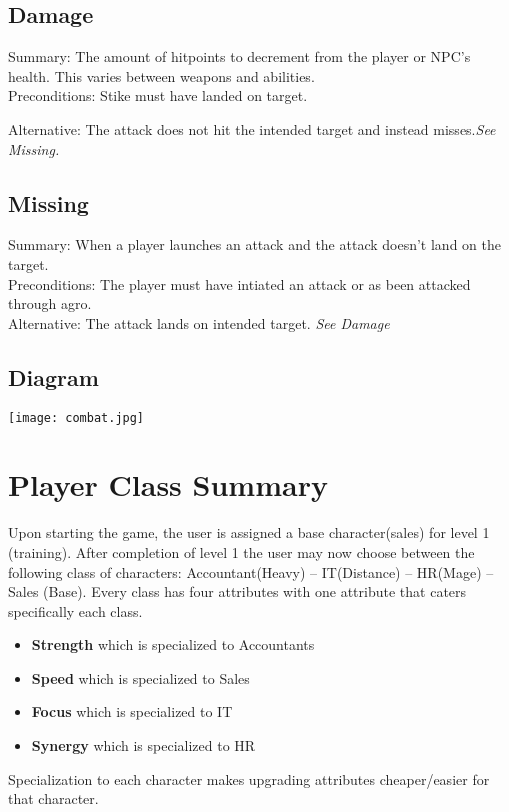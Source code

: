 \documentclass[12pt]{report}
\begin{document}
    \section{Damage}
    Summary: The amount of hitpoints to decrement from the player or NPC's health. This varies between weapons and abilities.\\
    
    Preconditions: Stike must have landed on target.
    
    Alternative: The attack does not hit the intended target and instead misses.\textit{See Missing.}
    
    \section{Missing}
    Summary: When a player launches an attack and the attack doesn't land on the target.\\
    
    Preconditions: The player must have intiated an attack or as been attacked through agro.\\
    Alternative: The attack lands on intended target. \textit{See Damage}

    \section{Diagram}
    \texttt{[image: combat.jpg]}
\chapter{Player Class Summary}
 Upon starting the game, the user is assigned a base character(sales) for level 1 (training). After completion of level 1 the user may now choose between the following class of characters: Accountant(Heavy) -- IT(Distance) -- HR(Mage) -- Sales (Base).  Every class has four attributes with one attribute that caters specifically each class.\\ 
\begin{itemize}
\item \textbf{Strength} which is specialized to Accountants\\ 
\item \textbf{Speed} which is specialized to Sales\\ 
\item \textbf{Focus} which is specialized to IT\\ 
\item \textbf{Synergy} which is specialized to HR\\  
\end{itemize}
Specialization to each character makes upgrading attributes cheaper/easier for that character.\\
\end{document}
